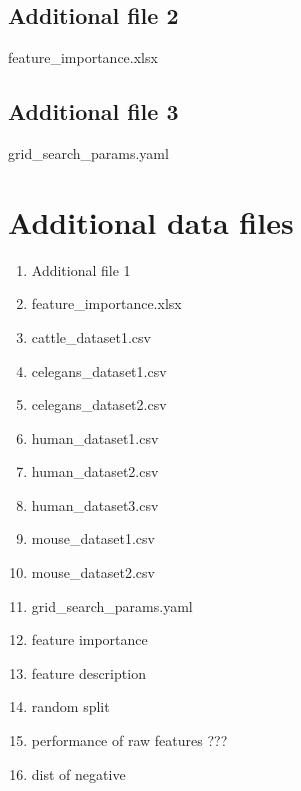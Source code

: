 \documentclass{bmcart}
\begin{document}
\begin{backmatter}
  \subsection*{Additional file 2}  \label{add:feature importance}
    feature\_importance.xlsx
 
 \subsection*{Additional file 3}  \label{add:hyperoptparams}
   grid\_search\_params.yaml




\section*{Additional data files}




\begin{enumerate}
\item Additional file 1
\item feature_importance.xlsx
\item cattle\_dataset1.csv
\item celegans\_dataset1.csv
\item celegans\_dataset2.csv
\item human\_dataset1.csv
\item human\_dataset2.csv
\item human\_dataset3.csv
\item mouse\_dataset1.csv
\item mouse\_dataset2.csv
\item grid\_search\_params.yaml
\item feature importance 
\item feature description
\item random split
\item performance of raw features ???
\item dist of negative


\end{enumerate}




\end{backmatter}
\end{document}
